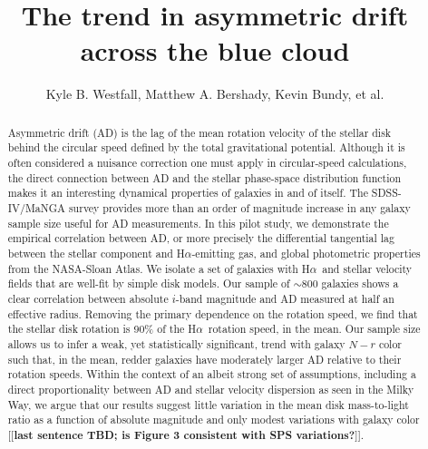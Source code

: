 \documentclass[apj,iop,revtex4,numberedappendix]{emulateapj}
\newcommand{\comment}[2][todo]{{\color{#1}[[{\bf #2}]]}}
\newcommand{\halpha}{H$\alpha$}
\begin{document}
\title{ The trend in asymmetric drift across the blue cloud }

\author{ Kyle B. Westfall, Matthew A.
Bershady, Kevin Bundy, et al. }





\begin{abstract}

Asymmetric drift (AD) is the lag of the mean rotation velocity of the
stellar disk behind the circular speed defined by the total
gravitational potential.  Although it is often considered a nuisance
correction one must apply in circular-speed calculations, the direct
connection between AD and the stellar phase-space distribution function
makes it an interesting dynamical properties of galaxies in and of
itself.  The SDSS-IV/MaNGA survey provides more than an order of
magnitude increase in any galaxy sample size useful for AD measurements.
In this pilot study, we demonstrate the empirical correlation between
AD, or more precisely the differential tangential lag between the
stellar component and \halpha-emitting gas, and global photometric
properties from the NASA-Sloan Atlas.  We isolate a set of galaxies with
\halpha\ and stellar velocity fields that are well-fit by simple disk
models.  Our sample of $\sim$800 galaxies shows a clear correlation
between absolute $i$-band magnitude and AD measured at half an effective
radius.  Removing the primary dependence on the rotation speed, we find
that the stellar disk rotation is 90\% of the \halpha\ rotation speed,
in the mean.  Our sample size allows us to infer a weak, yet
statistically significant, trend with galaxy $N-r$ color such that, in
the mean, redder galaxies have moderately larger AD relative to their
rotation speeds.  Within the context of an albeit strong set of
assumptions, including a direct proportionality between AD and stellar
velocity dispersion as seen in the Milky Way, we argue that our results
suggest little variation in the mean disk mass-to-light ratio as a
function of absolute magnitude and only modest variations with galaxy
color \comment{last sentence TBD; is Figure 3 consistent with SPS
variations?}.

\end{abstract}
\end{document}
